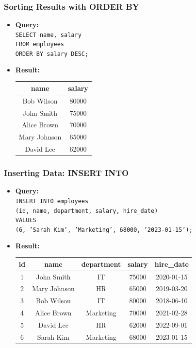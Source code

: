 \documentclass[10pt]{beamer}
\begin{document}
\begin{frame}[fragile]
  \frametitle{Sorting Results with ORDER BY}
  \begin{itemize}
    \item \textbf{Query:} \\
    \texttt{SELECT name, salary} \\
    \texttt{FROM employees} \\
    \texttt{ORDER BY salary DESC;}
    
    \item \textbf{Result:}
    \begin{center}
      \begin{tabular}{|c|c|}
        \hline
        \textbf{name} & \textbf{salary} \\
        \hline
        Bob Wilson & 80000 \\
        John Smith & 75000 \\
        Alice Brown & 70000 \\
        Mary Johnson & 65000 \\
        David Lee & 62000 \\
        \hline
      \end{tabular}
    \end{center}
  \end{itemize}
\end{frame}

\begin{frame}[fragile]
  \frametitle{Inserting Data: INSERT INTO}
  \begin{itemize}
    \item \textbf{Query:} \\
    \texttt{INSERT INTO employees} \\
    \texttt{(id, name, department, salary, hire\_date)} \\
    \texttt{VALUES} \\
    \texttt{(6, 'Sarah Kim', 'Marketing', 68000, '2023-01-15');}
    
    \item \textbf{Result:}
    \begin{center}
      \begin{tabular}{|c|c|c|c|c|}
        \hline
        \textbf{id} & \textbf{name} & \textbf{department} & \textbf{salary} & \textbf{hire\_date} \\
        \hline
        1 & John Smith & IT & 75000 & 2020-01-15 \\
        2 & Mary Johnson & HR & 65000 & 2019-03-20 \\
        3 & Bob Wilson & IT & 80000 & 2018-06-10 \\
        4 & Alice Brown & Marketing & 70000 & 2021-02-28 \\
        5 & David Lee & HR & 62000 & 2022-09-01 \\
        6 & Sarah Kim & Marketing & 68000 & 2023-01-15 \\
        \hline
      \end{tabular}
    \end{center}
  \end{itemize}
\end{frame}
\end{document}
